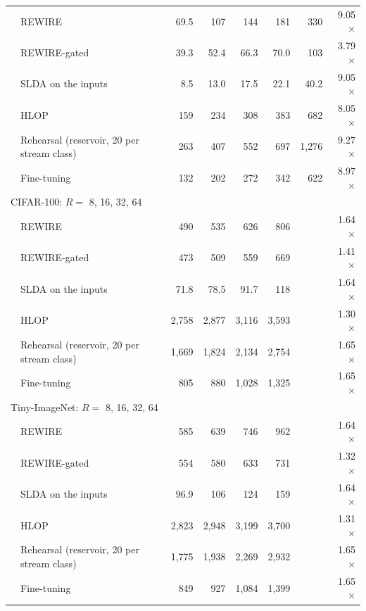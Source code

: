 \begin{tabular*}{\textwidth}{@{\extracolsep{\fill}}llrrrrrr@{}}
 & REWIRE & 69.5 & 107 & 144 & 181 & 330 & 9.05$\times$ \\
 & REWIRE-gated & 39.3 & 52.4 & 66.3 & 70.0 & 103 & 3.79$\times$ \\
 & SLDA on the inputs & 8.5 & 13.0 & 17.5 & 22.1 & 40.2 & 9.05$\times$ \\
 & HLOP & 159 & 234 & 308 & 383 & 682 & 8.05$\times$ \\
 & Rehearsal (reservoir, 20 per stream class) & 263 & 407 & 552 & 697 & 1,276 & 9.27$\times$ \\
 & Fine-tuning & 132 & 202 & 272 & 342 & 622 & 8.97$\times$ \\
\multicolumn{2}{l}{CIFAR-100: $R=$ 8, 16, 32, 64} &  &  &  &  &  &  \\
 & REWIRE & 490 & 535 & 626 & 806 &  & 1.64$\times$ \\
 & REWIRE-gated & 473 & 509 & 559 & 669 &  & 1.41$\times$ \\
 & SLDA on the inputs & 71.8 & 78.5 & 91.7 & 118 &  & 1.64$\times$ \\
 & HLOP & 2,758 & 2,877 & 3,116 & 3,593 &  & 1.30$\times$ \\
 & Rehearsal (reservoir, 20 per stream class) & 1,669 & 1,824 & 2,134 & 2,754 &  & 1.65$\times$ \\
 & Fine-tuning & 805 & 880 & 1,028 & 1,325 &  & 1.65$\times$ \\
\multicolumn{2}{l}{Tiny-ImageNet: $R=$ 8, 16, 32, 64} &  &  &  &  &  &  \\
 & REWIRE & 585 & 639 & 746 & 962 &  & 1.64$\times$ \\
 & REWIRE-gated & 554 & 580 & 633 & 731 &  & 1.32$\times$ \\
 & SLDA on the inputs & 96.9 & 106 & 124 & 159 &  & 1.64$\times$ \\
 & HLOP & 2,823 & 2,948 & 3,199 & 3,700 &  & 1.31$\times$ \\
 & Rehearsal (reservoir, 20 per stream class) & 1,775 & 1,938 & 2,269 & 2,932 &  & 1.65$\times$ \\
 & Fine-tuning & 849 & 927 & 1,084 & 1,399 &  & 1.65$\times$ \\
\bottomrule
\end{tabular*}
